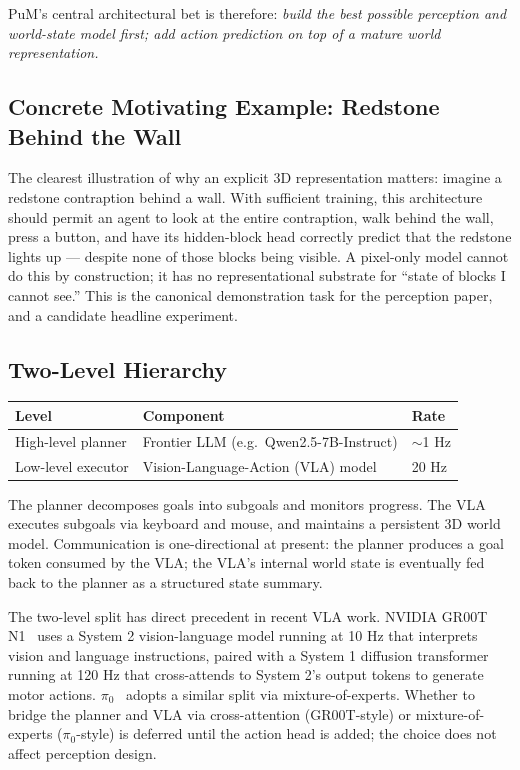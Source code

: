 \documentclass[11pt,a4paper]{article}
\begin{document}
PuM's central architectural bet is therefore: \textit{build the best possible perception and world-state model first; add action prediction on top of a mature world representation.}

\subsection{Concrete Motivating Example: Redstone Behind the Wall}

The clearest illustration of why an explicit 3D representation matters: imagine a redstone contraption behind a wall. With sufficient training, this architecture should permit an agent to look at the entire contraption, walk behind the wall, press a button, and have its hidden-block head correctly predict that the redstone lights up --- despite none of those blocks being visible. A pixel-only model cannot do this by construction; it has no representational substrate for ``state of blocks I cannot see.'' This is the canonical demonstration task for the perception paper, and a candidate headline experiment.

\subsection{Two-Level Hierarchy}

\begin{center}
\begin{tabular}{lll}
\toprule
Level & Component & Rate \\
\midrule
High-level planner & Frontier LLM (e.g.\ Qwen2.5-7B-Instruct) & $\sim$1 Hz \\
Low-level executor & Vision-Language-Action (VLA) model & 20 Hz \\
\bottomrule
\end{tabular}
\end{center}

The planner decomposes goals into subgoals and monitors progress. The VLA executes subgoals via keyboard and mouse, and maintains a persistent 3D world model. Communication is one-directional at present: the planner produces a goal token consumed by the VLA; the VLA's internal world state is eventually fed back to the planner as a structured state summary.

\begin{designdecision}
The two-level split has direct precedent in recent VLA work. NVIDIA GR00T N1~\cite{groot} uses a System 2 vision-language model running at 10 Hz that interprets vision and language instructions, paired with a System 1 diffusion transformer running at 120 Hz that cross-attends to System 2's output tokens to generate motor actions. $\pi_0$~\cite{pi0} adopts a similar split via mixture-of-experts. Whether to bridge the planner and VLA via cross-attention (GR00T-style) or mixture-of-experts ($\pi_0$-style) is deferred until the action head is added; the choice does not affect perception design.
\end{designdecision}
\end{document}
